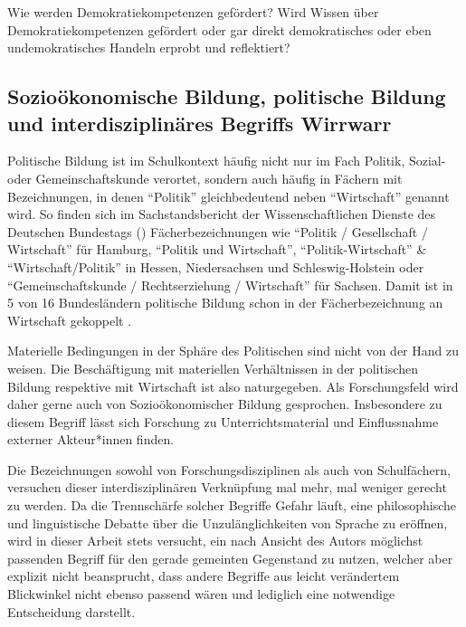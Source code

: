 
Wie werden Demokratiekompetenzen gefördert? Wird Wissen über Demokratiekompetenzen gefördert oder gar direkt demokratisches oder eben undemokratisches Handeln erprobt und reflektiert?


\subsection{Sozioökonomische Bildung, politische Bildung und interdisziplinäres Begriffs Wirrwarr \label{polBildung}}

Politische Bildung %
ist im Schulkontext häufig nicht nur im Fach Politik, Sozial- oder Gemeinschaftskunde verortet, sondern auch häufig in Fächern mit Bezeichnungen, in denen \enquote{Politik} gleichbedeutend neben \enquote{Wirtschaft} genannt wird. 
So finden sich im Sachstandsbericht der Wissenschaftlichen Dienste des Deutschen Bundestags (\citeyear[5]{WD8.2016}) Fächerbezeichnungen wie \enquote{Politik / Gesellschaft / Wirtschaft} für Hamburg, \enquote{Politik und Wirtschaft}, \enquote{Politik-Wirtschaft} \& \enquote{Wirtschaft/Politik} in Hessen, Niedersachsen und Schleswig-Holstein oder \enquote{Gemeinschaftskunde / Rechtserziehung / Wirtschaft} für Sachsen. Damit ist in 5 von 16 Bundesländern politische Bildung schon in der Fächerbezeichnung an Wirtschaft gekoppelt \autocite[vgl. zu der tatsächlichen Zeit, die für politische Bildung im Unterricht an allgemeinbildenden Schulen zur Verfügung steht auch][14 \& 16]{Gokbudak2020}.

Materielle Bedingungen in der Sphäre des Politischen sind nicht von der Hand zu weisen. Die Beschäftigung mit materiellen Verhältnissen in der politischen Bildung respektive mit Wirtschaft ist also naturgegeben.
Als Forschungsfeld wird daher gerne auch von Sozioökonomischer Bildung gesprochen.
Insbesondere zu diesem Begriff lässt sich Forschung zu Unterrichtsmaterial und Einflussnahme externer Akteur*innen finden.


Die Bezeichnungen sowohl von Forschungsdisziplinen als auch von Schulfächern, versuchen dieser interdisziplinären Verknüpfung mal mehr, mal weniger gerecht zu werden.
Da die Trennschärfe solcher Begriffe Gefahr läuft, eine philosophische und linguistische Debatte über die Unzulänglichkeiten von Sprache zu eröffnen, wird in dieser Arbeit stets versucht, ein nach Ansicht des Autors möglichst passenden Begriff für den gerade gemeinten Gegenstand zu nutzen, welcher aber explizit nicht beansprucht, dass andere Begriffe aus leicht verändertem Blickwinkel nicht ebenso passend wären und lediglich eine notwendige Entscheidung darstellt. 

